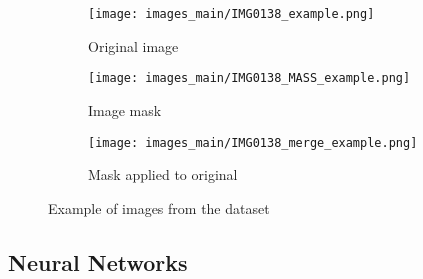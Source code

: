 \begin{frame}
  \begin{figure}
    \centering
    \begin{subfigure}[t]{.32\textwidth}
      \centering
      \texttt{[image: images\_main/IMG0138\_example.png]}
      \caption{Original image}
    \end{subfigure}
    \hfill
    \begin{subfigure}[t]{.32\textwidth}
      \centering
      \texttt{[image: images\_main/IMG0138\_MASS\_example.png]}
      \caption{Image mask}
    \end{subfigure}
    \hfill
    \begin{subfigure}[t]{.32\textwidth}
      \centering
      \texttt{[image: images\_main/IMG0138\_merge\_example.png]}
      \caption{Mask applied to original}
    \end{subfigure}
  
    \caption[Images from the dataset]{
      Example of images from the dataset
    }
  \end{figure}
\end{frame}

\subsection{Neural Networks}
\begin{frame}{\insertsubsec}
\end{frame}